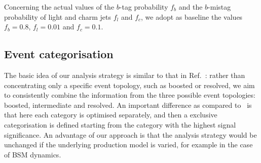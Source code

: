 Concerning the actual values of the $b$-tag probability $f_b$ and
the $b$-mistag probability of light and charm jets $f_l$ and  $f_c$, 
we adopt as baseline the values $f_b=0.8$, $f_l=0.01$
and  $f_c=0.1$.
%


\subsection{Event categorisation}
\label{sec:categorisation}

The basic idea of our analysis strategy is similar to that in Ref.~\cite{Gouzevitch:2013qca}:
rather than concentrating only a specific event topology, such as boosted
or resolved, we aim to consistently combine the information from
the three possible event topologies: boosted, intermediate and
resolved.
%
An important difference as compared to~\cite{Gouzevitch:2013qca}
is that here each category is optimised separately, and then
a exclusive categorisation is defined starting from the category
with the highest signal significance.
%
An advantage of our approach is that the analysis strategy would be unchanged
if the underlying production model is varied, for example in the case of
BSM dynamics.

